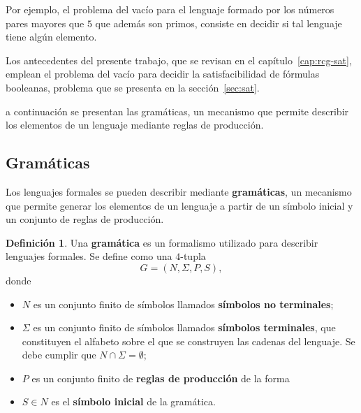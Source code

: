 \documentclass{article}
\theoremstyle{definition}
\newtheorem{definicion}{Definición}
\theoremstyle{plain}
\theoremstyle{remark}
\begin{document}
Por ejemplo, el problema del vacío para el lenguaje formado por los
números pares mayores que $5$ que además son primos, consiste en
decidir si tal lenguaje tiene algún elemento. 

Los antecedentes del
presente trabajo, que se revisan en el capítulo~\ref{cap:rcg-sat},
emplean el problema del vacío para decidir la satisfacibilidad de
fórmulas booleanas, problema que se presenta en la
sección~\ref{sec:sat}.

 a continuación se presentan las gramáticas, un mecanismo
que permite describir los elementos de un lenguaje mediante reglas de
producción.

\subsection{Gramáticas}
\label{sec:gramaticas}

Los lenguajes formales se pueden describir mediante \textbf{gramáticas},
un mecanismo que permite generar los elementos de un lenguaje a partir
de un símbolo inicial y un conjunto de reglas de producción.

\begin{definicion}
  Una \textbf{gramática} es un formalismo utilizado para describir
  lenguajes formales. Se define como una $4$-tupla
  \[
    G = (N, \Sigma, P, S),
  \]
  donde
  \begin{itemize}
    \item $N$ es un conjunto finito de símbolos llamados
          \textbf{símbolos no terminales};
    \item $\Sigma$ es un conjunto finito de símbolos llamados
          \textbf{símbolos terminales}, que constituyen el alfabeto sobre el
          que se construyen las cadenas del lenguaje. Se debe cumplir que
          $N \cap \Sigma = \emptyset$;
    \item $P$ es un conjunto finito de \textbf{reglas de producción} de la
          forma
    \item $S \in N$ es el \textbf{símbolo inicial} de la gramática.
  \end{itemize}
\end{definicion}
\end{document}
